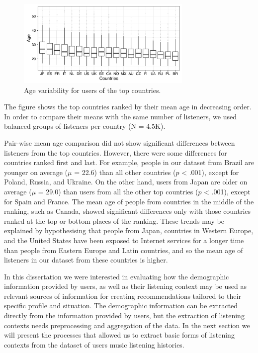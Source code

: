 \begin{figure}[!h]
	\centering
	\includegraphics[width=0.75\textwidth]{5_age_of_listeners_per_country.pdf}
	\caption[Age variability for users in the top countries]{Age variability for users of the top countries.}
	\label{fig:5_age_of_listeners_per_country}
\end{figure} 

The figure shows the top countries ranked by their mean age in decreasing order. In order to compare their means with the same number of listeners, we used balanced groups of listeners per country (N = 4.5K).


Pair-wise mean age comparison did not show significant differences between listeners from the top countries. However, there were some differences for countries ranked first and last. For example, people in our dataset from Brazil are younger on average ($\mu$ = 22.6) than all other countries ($p$ < .001), except for Poland, Russia, and Ukraine. On the other hand, users from Japan are older on average ($\mu$ = 29.0) than users from all the other top countries ($p$ < .001), except for Spain and France. 
The mean age of people from countries in the middle of the ranking, such as Canada, showed significant differences only with those countries ranked at the top or bottom places of the ranking. 
These trends may be explained by hypothesising that people from Japan, countries in Western Europe, and the United States have been exposed to Internet services for a longer time than people from Eastern Europe and Latin countries, and so the mean age of listeners in our dataset from these countries is higher.

In this dissertation we were interested in evaluating how the demographic information provided by users, as well as their listening context may be used as relevant sources of information for creating recommendations tailored to their specific profile and situation. 
The demographic information can be extracted directly from the information provided by users, but the extraction of listening contexts needs preprocessing and aggregation of the data. In the next section we will present the processes that allowed us to extract basic forms of listening contexts from the dataset of users music listening histories.





